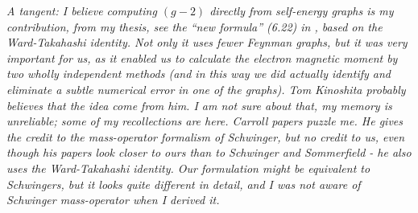 \begin{description}
    {\em
    A tangent:
    I believe computing $(g-2)$ directly from self-energy graphs is my
    contribution, from my thesis, see the ``new formula'' (6.22) in
    , based on the Ward-Takahashi identity. Not only it
    uses fewer Feynman graphs, but it was very important for us, as it
    enabled us to calculate the electron magnetic moment by two wholly
    independent methods (and in this way we did actually identify and
    eliminate a subtle numerical error in one of the graphs). Tom
    Kinoshita probably believes that the idea come from him. I am not
    sure about that, my memory is unreliable; some of my recollections
    are
    {here}.
%
Carroll papers puzzle me. He gives the credit to
the mass-operator formalism of
Schwinger, but no credit to
us, even though his papers look closer to ours than to
Schwinger and Sommerfield - he also uses the Ward-Takahashi identity. Our
formulation might be equivalent to Schwingers, but it looks quite
different in detail, and I was not aware of Schwinger mass-operator when
I derived it.
    }


\end{description}

